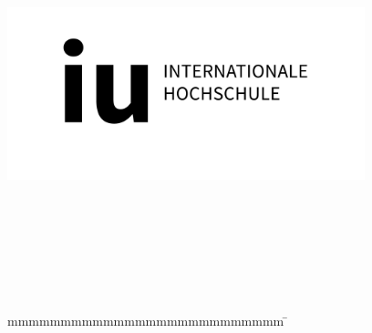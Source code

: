 
\begin{titlepage}
	\begin{center}
		\includegraphics[height=5cm]{images/cover/iu_Logo_D_black_RGB_horizontal.jpg}
	\end{center}
	\enlargethispage{20mm}
	\begin{center}

		\vspace*{12mm}	{\large\textbf {\documentTypePhrase}}\\


		\vspace*{12mm}	 \locationUniversity{} \studyType\\
		\vspace*{0mm}	\coursePhrase{} \course\\
		\vspace*{0mm}	\departmentPhrase{} \department\\

		\doublespacing{
			\vspace*{12mm}	{\LARGE\textbf \documentTitle }}\\
		
	\end{center}
	\vfill
	\begin{spacing}{1.2}
		\begin{tabbing}
			mmmmmmmmmmmmmmmmmmmmmmmmmm             \= \kill
            

\end{tabbing}
\end{spacing}
\end{titlepage}
